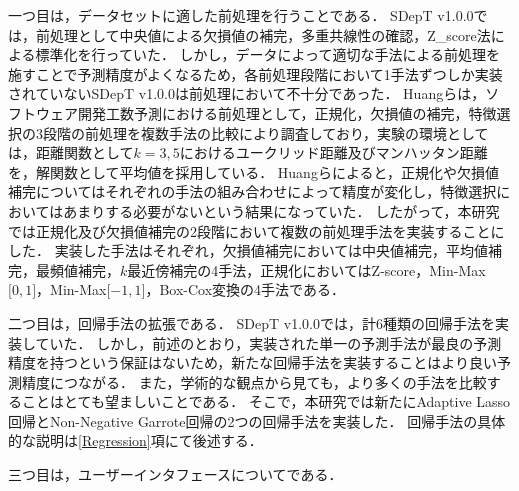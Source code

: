 一つ目は，データセットに適した前処理を行うことである．
SDepT v1.0.0では，前処理として中央値による欠損値の補完，多重共線性の確認，Z\_score法による標準化を行っていた．
しかし，データによって適切な手法による前処理を施すことで予測精度がよくなるため，各前処理段階において1手法ずつしか実装されていないSDepT v1.0.0は前処理において不十分であった．
Huangら\cite{Huang2017}は，ソフトウェア開発工数予測における前処理として，正規化，欠損値の補完，特徴選択の3段階の前処理を複数手法の比較により調査しており，実験の環境としては，距離関数として$k=3,5$におけるユークリッド距離及びマンハッタン距離を，解関数として平均値を採用している．
Huangら\cite{Huang2017}によると，正規化や欠損値補完についてはそれぞれの手法の組み合わせによって精度が変化し，特徴選択においてはあまりする必要がないという結果になっていた．
したがって，本研究では正規化及び欠損値補完の2段階において複数の前処理手法を実装することにした．
実装した手法はそれぞれ，欠損値補完においては中央値補完，平均値補完，最頻値補完，$k$最近傍補完の4手法，正規化においてはZ-score，Min-Max$\lbrack0, 1\rbrack$，Min-Max$\lbrack-1, 1\rbrack$，Box-Cox変換の4手法である．

二つ目は，回帰手法の拡張である．
SDepT v1.0.0では，計6種類の回帰手法を実装していた．
しかし，前述のとおり，実装された単一の予測手法が最良の予測精度を持つという保証はないため，新たな回帰手法を実装することはより良い予測精度につながる．
また，学術的な観点から見ても，より多くの手法を比較することはとても望ましいことである．
そこで，本研究では新たにAdaptive Lasso回帰とNon-Negative Garrote回帰の2つの回帰手法を実装した．
回帰手法の具体的な説明は\ref{Regression}項にて後述する．

三つ目は，ユーザーインタフェースについてである．